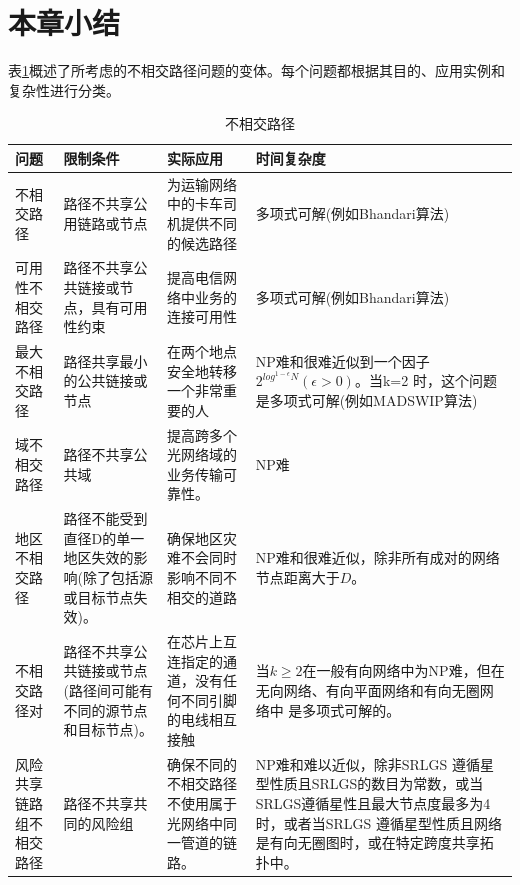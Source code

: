 \section{本章小结}
表\ref{tab:disjointPath}概述了所考虑的不相交路径问题的变体。每个问题都根据其目的、应用实例和复杂性进行分类。

\begin{table}[htbp]
\caption{不相交路径}\label{tab:disjointPath}
\vspace{0.5em}\centering\wuhao
\begin{tabularx}{46em}{|*{4}{>{\centering\arraybackslash}X|}}
\toprule[1.5pt]
问题   & 限制条件   & 实际应用 & 时间复杂度  \\
\midrule[1pt]
不相交路径 & 路径不共享公用链路或节点 & 为运输网络中的卡车司机提供不同的候选路径 & 多项式可解(例如Bhandari算法\cite{bhandari1997optimal})\\
\hline
可用性不相交路径 & 路径不共享公共链接或节点，具有可用性约束 & 提高电信网络中业务的连接可用性 & 多项式可解(例如Bhandari算法\cite{bhandari1997optimal})\\
\hline
最大不相交路径 & 路径共享最小的公共链接或节点 & 在两个地点安全地转移一个非常重要的人 & NP难和很难近似到一个因子$2^{log^{1-\epsilon}N}(\epsilon>0)$。当k=2 时，这个问题是多项式可解(例如MADSWIP算法\cite{taft1999quality})\\
\hline
域不相交路径 & 路径不共享公共域 & 提高跨多个光网络域的业务传输可靠性。 & NP难\cite{gao2013domain}\\
\hline
地区不相交路径 & 路径不能受到直径D的单一地区失效的影响(除了包括源或目标节点失效)。 & 确保地区灾难不会同时影响不同不相交的道路 & NP难和很难近似\cite{trajanovski2015finding}，除非所有成对的网络节点距离大于$D$。\\
\hline
不相交路径对 & 路径不共享公共链接或节点(路径间可能有不同的源节点和目标节点)。 & 在芯片上互连指定的通道，没有任何不同引脚的电线相互接触 & 当$k\geq2$在一般有向网络中为NP难\cite{fortune1980directed}，但在无向网络\cite{robertson1995graph}、有向平面网络\cite{schrijver1994finding}和有向无圈网络中\cite{fortune1980directed} 是多项式可解的。 \\
\hline
风险共享链路组不相交路径 & 路径不共享共同的风险组 & 确保不同的不相交路径不使用属于光网络中同一管道的链路。 & NP难\cite{hu2003diverse}和难以近似\cite{coudert2007shared}，除非SRLGS 遵循星型性质且SRLGS的数目为常数\cite{bermond2013srlg}，或当SRLGS遵循星性且最大节点度最多为4\cite{bermond2013srlg}时，或者当SRLGS 遵循星型性质且网络是有向无圈图\cite{bermond2013srlg}时，或在特定跨度共享拓扑\cite{bhandari1994optimal}中。\\
\bottomrule[1.5pt]
\end{tabularx}
\vspace{\baselineskip}
\end{table}

